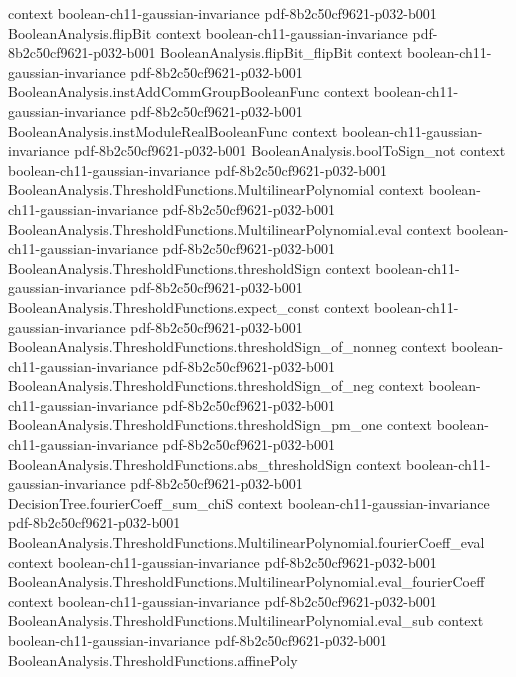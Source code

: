\begin{theorem}
  {context}
  {boolean-ch11-gaussian-invariance}
  {pdf-8b2c50cf9621-p032-b001}
\proofstep
  {BooleanAnalysis.flipBit}
  {context}
  {boolean-ch11-gaussian-invariance}
  {pdf-8b2c50cf9621-p032-b001}
\proofstep
  {BooleanAnalysis.flipBit_flipBit}
  {context}
  {boolean-ch11-gaussian-invariance}
  {pdf-8b2c50cf9621-p032-b001}
\proofstep
  {BooleanAnalysis.instAddCommGroupBooleanFunc}
  {context}
  {boolean-ch11-gaussian-invariance}
  {pdf-8b2c50cf9621-p032-b001}
\proofstep
  {BooleanAnalysis.instModuleRealBooleanFunc}
  {context}
  {boolean-ch11-gaussian-invariance}
  {pdf-8b2c50cf9621-p032-b001}
\proofstep
  {BooleanAnalysis.boolToSign_not}
  {context}
  {boolean-ch11-gaussian-invariance}
  {pdf-8b2c50cf9621-p032-b001}
\proofstep
  {BooleanAnalysis.ThresholdFunctions.MultilinearPolynomial}
  {context}
  {boolean-ch11-gaussian-invariance}
  {pdf-8b2c50cf9621-p032-b001}
\proofstep
  {BooleanAnalysis.ThresholdFunctions.MultilinearPolynomial.eval}
  {context}
  {boolean-ch11-gaussian-invariance}
  {pdf-8b2c50cf9621-p032-b001}
\proofstep
  {BooleanAnalysis.ThresholdFunctions.thresholdSign}
  {context}
  {boolean-ch11-gaussian-invariance}
  {pdf-8b2c50cf9621-p032-b001}
\proofstep
  {BooleanAnalysis.ThresholdFunctions.expect_const}
  {context}
  {boolean-ch11-gaussian-invariance}
  {pdf-8b2c50cf9621-p032-b001}
\proofstep
  {BooleanAnalysis.ThresholdFunctions.thresholdSign_of_nonneg}
  {context}
  {boolean-ch11-gaussian-invariance}
  {pdf-8b2c50cf9621-p032-b001}
\proofstep
  {BooleanAnalysis.ThresholdFunctions.thresholdSign_of_neg}
  {context}
  {boolean-ch11-gaussian-invariance}
  {pdf-8b2c50cf9621-p032-b001}
\proofstep
  {BooleanAnalysis.ThresholdFunctions.thresholdSign_pm_one}
  {context}
  {boolean-ch11-gaussian-invariance}
  {pdf-8b2c50cf9621-p032-b001}
\proofstep
  {BooleanAnalysis.ThresholdFunctions.abs_thresholdSign}
  {context}
  {boolean-ch11-gaussian-invariance}
  {pdf-8b2c50cf9621-p032-b001}
\proofstep
  {DecisionTree.fourierCoeff_sum_chiS}
  {context}
  {boolean-ch11-gaussian-invariance}
  {pdf-8b2c50cf9621-p032-b001}
\proofstep
  {BooleanAnalysis.ThresholdFunctions.MultilinearPolynomial.fourierCoeff_eval}
  {context}
  {boolean-ch11-gaussian-invariance}
  {pdf-8b2c50cf9621-p032-b001}
\proofstep
  {BooleanAnalysis.ThresholdFunctions.MultilinearPolynomial.eval_fourierCoeff}
  {context}
  {boolean-ch11-gaussian-invariance}
  {pdf-8b2c50cf9621-p032-b001}
\proofstep
  {BooleanAnalysis.ThresholdFunctions.MultilinearPolynomial.eval_sub}
  {context}
  {boolean-ch11-gaussian-invariance}
  {pdf-8b2c50cf9621-p032-b001}
\proofstep
  {BooleanAnalysis.ThresholdFunctions.affinePoly}

\end{theorem}
